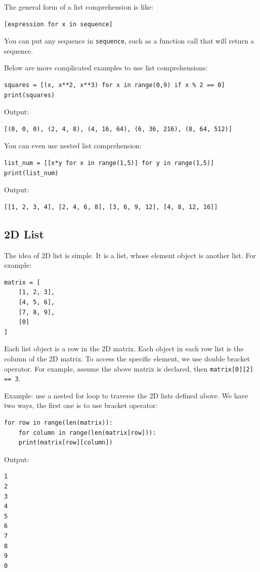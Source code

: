 \documentclass[12pt]{book}
\begin{document}
The general form of a list comprehension is like:
\begin{verbatim}
[expression for x in sequence]
\end{verbatim}
You can put any sequence in \texttt{sequence}, such as a function call that will return a sequence.

Below are more complicated examples to use list comprehensions:
\begin{verbatim}
squares = [(x, x**2, x**3) for x in range(0,9) if x % 2 == 0]
print(squares)
\end{verbatim}
Output:
\begin{verbatim}
[(0, 0, 0), (2, 4, 8), (4, 16, 64), (6, 36, 216), (8, 64, 512)]
\end{verbatim}

You can even use nested list comprehension:
\begin{verbatim}
list_num = [[x*y for x in range(1,5)] for y in range(1,5)]
print(list_num)
\end{verbatim}
Output:
\begin{verbatim}
[[1, 2, 3, 4], [2, 4, 6, 8], [3, 6, 9, 12], [4, 8, 12, 16]]
\end{verbatim}

\subsection{2D List}
\label{sec:org23828b8}
The idea of 2D list is simple. It is a list, whose element object is another list. For example:
\begin{verbatim}
matrix = [
    [1, 2, 3],
    [4, 5, 6],
    [7, 8, 9],
    [0]
]
\end{verbatim}

Each list object is a row in the 2D matrix. Each object in each row list is the column of the 2D matrix. To access the specific element, we use double bracket operator. For example, assume the above matrix is declared, then \texttt{matrix[0][2] == 3}.

Example: use a nested for loop to traverse the 2D lists defined above. We have two ways, the first one is to use bracket operator:
\begin{verbatim}
for row in range(len(matrix)):
    for column in range(len(matrix[row])):
	print(matrix[row][column])
\end{verbatim}
Output:
\begin{verbatim}
1
2
3
4
5
6
7
8
9
0
\end{verbatim}
\end{document}
